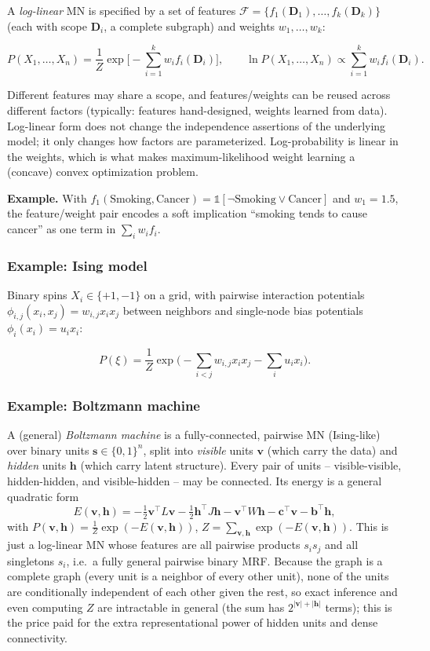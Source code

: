 \documentclass[11pt]{article}
\begin{document}
A \emph{log-linear} MN is specified by a set of features
$\mathcal{F} = \{f_1(\mathbf{D}_1), \dots, f_k(\mathbf{D}_k)\}$ (each with
scope $\mathbf{D}_i$, a complete subgraph) and weights $w_1, \dots, w_k$:

\[
P(X_1, \dots, X_n) = \frac{1}{Z} \exp\Big[-\sum_{i=1}^k w_i f_i(\mathbf{D}_i)\Big],
\qquad
\ln P(X_1,\dots,X_n) \propto \sum_{i=1}^k w_i f_i(\mathbf{D}_i).
\]

Different features may share a scope, and features/weights can be reused
across different factors (typically: features hand-designed, weights
learned from data). Log-linear form does not change the independence
assertions of the underlying model; it only changes how factors are
parameterized. Log-probability is linear in the weights, which is what
makes maximum-likelihood weight learning a (concave) convex optimization
problem.

\textbf{Example.} With $f_1(\text{Smoking}, \text{Cancer}) = \mathbb{1}[\lnot
\text{Smoking} \lor \text{Cancer}]$ and $w_1 = 1.5$, the feature/weight pair
encodes a soft implication ``smoking tends to cause cancer'' as one term in
$\sum_i w_i f_i$.

\subsubsection{Example: Ising model}

Binary spins $X_i \in \{+1,-1\}$ on a grid, with pairwise interaction
potentials $\phi_{i,j}(x_i,x_j) = w_{i,j} x_i x_j$ between neighbors and
single-node bias potentials $\phi_i(x_i) = u_i x_i$:

\[
P(\xi) = \frac{1}{Z}\exp\Big(-\sum_{i<j} w_{i,j} x_i x_j - \sum_i u_i x_i\Big).
\]

\subsubsection{Example: Boltzmann machine}

A (general) \emph{Boltzmann machine} is a fully-connected, pairwise MN
(Ising-like) over binary units $\mathbf{s} \in \{0,1\}^n$, split into
\emph{visible} units $\mathbf{v}$ (which carry the data) and \emph{hidden}
units $\mathbf{h}$ (which carry latent structure). Every pair of units --
visible-visible, hidden-hidden, and visible-hidden -- may be connected. Its
energy is a general quadratic form
\[
E(\mathbf{v},\mathbf{h}) = -\tfrac12\mathbf{v}^\top L \mathbf{v}
- \tfrac12\mathbf{h}^\top J \mathbf{h} - \mathbf{v}^\top W \mathbf{h}
- \mathbf{c}^\top \mathbf{v} - \mathbf{b}^\top \mathbf{h},
\]
with $P(\mathbf{v},\mathbf{h}) = \frac{1}{Z}\exp(-E(\mathbf{v},\mathbf{h}))$,
$Z = \sum_{\mathbf{v},\mathbf{h}} \exp(-E(\mathbf{v},\mathbf{h}))$. This is
just a log-linear MN whose features are all pairwise products $s_i s_j$ and
all singletons $s_i$, i.e.\ a fully general pairwise binary MRF. Because the
graph is a complete graph (every unit is a neighbor of every other unit),
none of the units are conditionally independent of each other given the
rest, so exact inference and even computing $Z$ are intractable in general
(the sum has $2^{|\mathbf{v}|+|\mathbf{h}|}$ terms); this is the price paid
for the extra representational power of hidden units and dense
connectivity.
\end{document}

